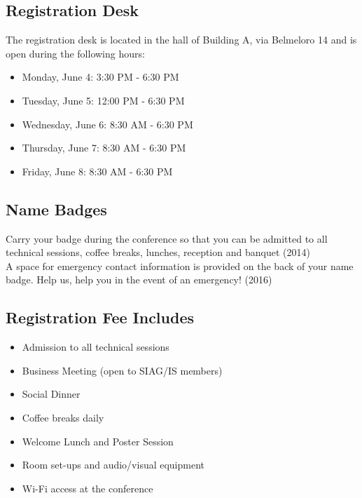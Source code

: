 \documentclass[10pt, a4paper]{book}
\begin{document}
\begin{multicols}{2}
\section*{Registration Desk}
The registration desk is located in the hall of Building A, via Belmeloro 14 and is open during the following hours:
\begin{itemize}
\item Monday, June 4: 3:30 PM - 6:30 PM
\item Tuesday, June 5: 12:00 PM - 6:30 PM
\item Wednesday, June 6: 8:30 AM - 6:30 PM
\item Thursday, June 7: 8:30 AM - 6:30 PM
\item Friday, June 8: 8:30 AM - 6:30 PM
\end{itemize}
\subsection*{Name Badges} Carry your badge during the conference so that you can be admitted to all technical sessions, coffee breaks, lunches, reception and banquet (2014)\\
A space for emergency contact information is provided on the back of your name badge. Help us, help you in the event of an emergency! (2016)
\subsection*{Registration Fee Includes}
\begin{itemize}
\item Admission to all technical sessions
\item Business Meeting (open to SIAG/IS members)
\item Social Dinner
\item Coffee breaks daily
\item Welcome Lunch and Poster Session
\item Room set-ups and audio/visual equipment
\item Wi-Fi access at the conference
\end{itemize}%

\end{multicols}
\end{document}
